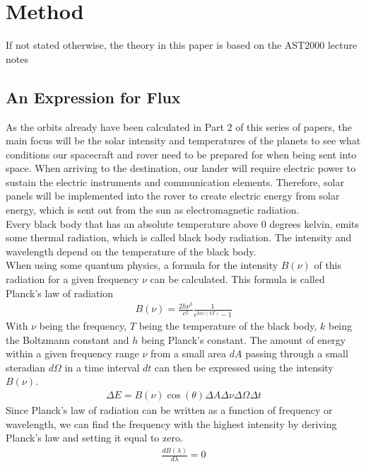 \documentclass[reprint,english,notitlepage]{revtex4-2}
\begin{document}
\section{Method} \label{sec:method}
If not stated otherwise, the theory in this paper is based on the AST2000 lecture notes%
\subsection{An Expression for Flux}\label{subsec:an-expression-for-flux}
As the orbits already have been calculated in Part 2%
of this series of papers, the main focus will be the solar intensity and temperatures of the planets to see what conditions our spacecraft and rover need to be prepared for when being sent into space.
When arriving to the destination, our lander will require electric power to sustain the electric instruments and communication elements.
Therefore, solar panels will be implemented into the rover to create electric energy from solar energy, which is sent out from the sun as electromagnetic radiation.\\
Every black body that has an absolute temperature above 0 degrees kelvin, emits some thermal radiation, which is called black body radiation.
The intensity and wavelength depend on the temperature of the black body.\\
When using some quantum physics, a formula for the intensity $B(\nu)$ of this radiation for a given frequency $\nu$ can be calculated.
This formula is called Planck's law of radiation
\begin{align*}
    B(\nu) = \frac{2h\nu^3}{c^2}\frac{1}{e^{h\nu/(kT)}-1}
\end{align*}
With $\nu$ being the frequency, $T$ being the temperature of the black body, $k$ being the Boltzmann constant and $h$ being Planck's constant.
The amount of energy within a given frequency range $\nu$ from a small area $dA$ passing through a small steradian $d\Omega$ in a time interval $dt$ can then be expressed using the intensity $B(\nu)$.
\begin{align*}
    \Delta E = B(\nu) \cos\left(\theta\right) \Delta A \Delta\nu \Delta\Omega \Delta t
\end{align*}
Since Planck's law of radiation can be written as a function of frequency or wavelength, we can find the frequency with the highest intensity by deriving Planck's law and setting it equal to zero.
\begin{align*}
	\frac{dB(\lambda)}{d\lambda} = 0
\end{align*}\\
\end{document}

